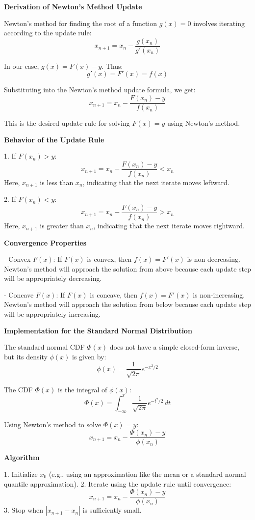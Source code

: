 \documentclass[8pt]{article}
\begin{document}
\textbf{Derivation of Newton's Method Update}

Newton's method for finding the root of a function \( g(x) = 0 \) involves iterating according to the update rule:
\[
x_{n+1} = x_n - \frac{g(x_n)}{g'(x_n)}
\]

In our case, \( g(x) = F(x) - y \). Thus:
\[
g'(x) = F'(x) = f(x)
\]

Substituting into the Newton's method update formula, we get:
\[
x_{n+1} = x_n - \frac{F(x_n) - y}{f(x_n)}
\]

This is the desired update rule for solving \( F(x) = y \) using Newton's method.

\textbf{Behavior of the Update Rule}

1. If \( F(x_n) > y \):
   \[
   x_{n+1} = x_n - \frac{F(x_n) - y}{f(x_n)} < x_n
   \]
   Here, \( x_{n+1} \) is less than \( x_n \), indicating that the next iterate moves leftward.

2. If \( F(x_n) < y \):
   \[
   x_{n+1} = x_n - \frac{F(x_n) - y}{f(x_n)} > x_n
   \]
   Here, \( x_{n+1} \) is greater than \( x_n \), indicating that the next iterate moves rightward.

\textbf{Convergence Properties}

- Convex \( F(x) \): If \( F(x) \) is convex, then \( f(x) = F'(x) \) is non-decreasing. Newton's method will approach the solution from above because each update step will be appropriately decreasing.

- Concave \( F(x) \): If \( F(x) \) is concave, then \( f(x) = F'(x) \) is non-increasing. Newton's method will approach the solution from below because each update step will be appropriately increasing.

\textbf{Implementation for the Standard Normal Distribution}

The standard normal CDF \( \Phi(x) \) does not have a simple closed-form inverse, but its density \( \phi(x) \) is given by:
\[
\phi(x) = \frac{1}{\sqrt{2\pi}} e^{-x^2/2}
\]

The CDF \( \Phi(x) \) is the integral of \( \phi(x) \):
\[
\Phi(x) = \int_{-\infty}^x \frac{1}{\sqrt{2\pi}} e^{-t^2/2} \, dt
\]

Using Newton's method to solve \( \Phi(x) = y \):
\[
x_{n+1} = x_n - \frac{\Phi(x_n) - y}{\phi(x_n)}
\]

\textbf{Algorithm}

1. Initialize \( x_0 \) (e.g., using an approximation like the mean or a standard normal quantile approximation).
2. Iterate using the update rule until convergence:
   \[
   x_{n+1} = x_n - \frac{\Phi(x_n) - y}{\phi(x_n)}
   \]
3. Stop when \( |x_{n+1} - x_n| \) is sufficiently small.
\end{document}
